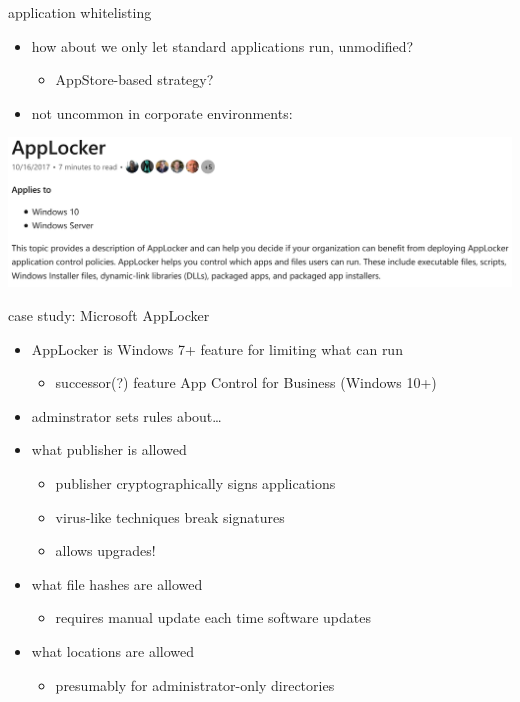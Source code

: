 \begin{frame}{application whitelisting}
\begin{itemize}
\item how about we only let standard applications run, unmodified?
    \begin{itemize}
    \item AppStore-based strategy?
    \end{itemize}
\item not uncommon in corporate environments:
\end{itemize}
\vspace{.5cm}
\includegraphics[width=\textwidth]{../heur-detect/applocker-manual}
\end{frame}

\begin{frame}{case study: Microsoft AppLocker}
    \begin{itemize}
    \item AppLocker is Windows 7+ feature for limiting what can run
        \begin{itemize}
        \item successor(?) feature App Control for Business (Windows 10+)
        \end{itemize}
    \item adminstrator sets rules about\ldots
    \item what publisher is allowed
        \begin{itemize}
        \item publisher cryptographically signs applications
        \item virus-like techniques break signatures
        \item allows upgrades!
        \end{itemize}
    \item what file hashes are allowed
        \begin{itemize}
        \item requires manual update each time software updates
        \end{itemize}
    \item what locations are allowed
        \begin{itemize}
        \item presumably for administrator-only directories
        \end{itemize}
    \end{itemize}
\end{frame}

